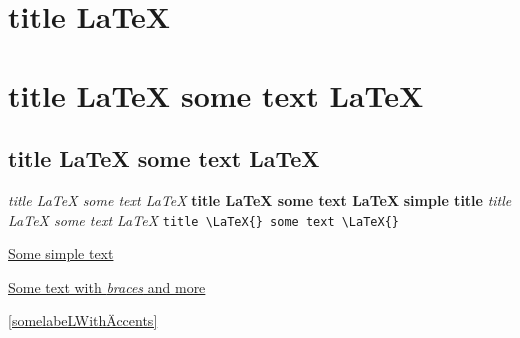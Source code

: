 \documentclass{article}
\begin{document}
\chapter{title \LaTeX{}}
\chapter{title \LaTeX{} some text \LaTeX{}}
\section{title \LaTeX{} some text \LaTeX{}}
\emph{title \LaTeX{} some text \LaTeX{}}
\textbf{title \LaTeX{} some text \LaTeX{}}
\textbf{simple title}
\textit{title \LaTeX{} some text {\LaTeX{}}}
\verb!title \LaTeX{} some text \LaTeX{}!


\underline{Some simple text}

\underline{Some text with {\em braces} and more}

\ref{somelabeLWithÄccents}
\end{document}
